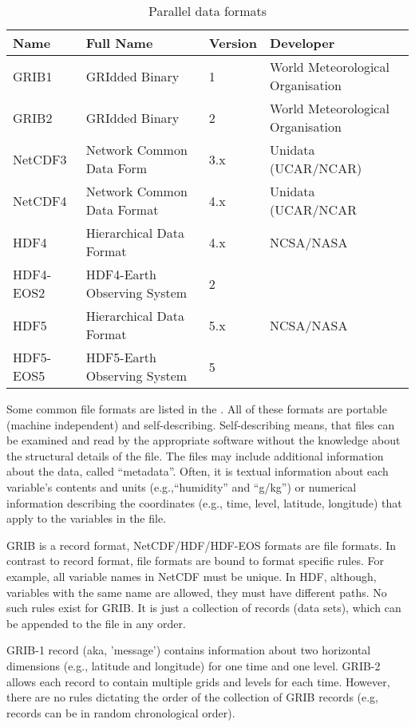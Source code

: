 \begin{table}
  \centering
  \begin{tabular}{l|l|l|l}
    Name      & Full Name                   & Version & Developer \\
    \hline
    GRIB1     & GRIdded Binary             & 1       & World Meteorological Organisation\\
    GRIB2     & GRIdded Binary             & 2       & World Meteorological Organisation\\
    NetCDF3   & Network Common Data Form   & 3.x     & Unidata (UCAR/NCAR)\\
    NetCDF4   & Network Common Data Format & 4.x     & Unidata (UCAR/NCAR\\
    HDF4      & Hierarchical Data Format   & 4.x     & NCSA/NASA\\
    HDF4-EOS2 & HDF4-Earth Observing System & 2       & \\
    HDF5      & Hierarchical Data Format   & 5.x     & NCSA/NASA\\
    HDF5-EOS5 & HDF5-Earth Observing System & 5       & \\
\end{tabular}
\caption{Parallel data formats}
\label{tab:fformats}
\end{table}


Some common file formats are listed in the .
All of these formats are portable (machine independent) and self-describing.
Self-describing means, that files can be examined and read by the appropriate software without the knowledge about the structural details of the file.
The files may include additional information about the data, called ``metadata''.
Often, it is textual information about each variable's contents and units (e.g.,``humidity'' and ``g/kg'') or numerical information describing the coordinates (e.g., time, level, latitude, longitude) that apply to the variables in the file.

GRIB is a record format, NetCDF/HDF/HDF-EOS formats are file formats.
In contrast to record format, file formats are bound to format specific rules.
For example, all variable names in NetCDF must be unique.
In HDF, although, variables with the same name are allowed, they must have different paths.
No such rules exist for GRIB.
It is just a collection of records (data sets), which can be appended to the file in any order.

GRIB-1 record (aka, 'message') contains information about two horizontal dimensions (e.g., latitude and longitude) for one time and one level.
GRIB-2 allows each record to contain multiple grids and levels for each time.
However, there are no rules dictating the order of the collection of GRIB records (e.g, records can be in random chronological order).


